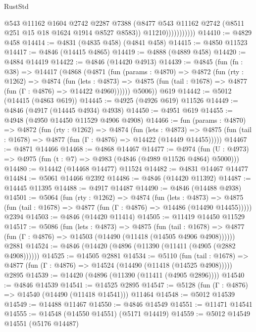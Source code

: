 \begin{lexlean}{RustStd}
\begin{coremodule}
                          @543
                          @11162
                          @1604
                          @2742
                          @2287
                          @7388
                          (@8477 @543 @11162 @2742 (@8511 @251 @15 @18 @1624 @1914 @8527 @8583))
                          @11210)))))))))))
@14410 := @4829 @458
@14414 := @4831 (@4835 @458) (@4841 @458)
@14415 := @4850 @11523
@14417 := @4846 (@14415 @4865)
@14419 := @4888 (@4889 @458)
@14420 := @4884 @14419
@14422 := @4846 (@14420 @4913)
@14439 := @4845
    (fun (fn : @38) =>
    @14417
      (@4868
        (@4871
          (fun (params : @4870) =>
          @4872
            (fun (rty : @1262) =>
            @4874
              (fun (lets : @4873) =>
              @4875 (fun (tail : @1678) => @4877 (fun (Γ : @4876) => @14422 @4960))))))
        @5006))
    @619
@14442 := @5012 (@14415 (@4863 @619))
@14445 := @4925 (@4926 @619) @11526
@14449 := @4846 (@4917 (@14445 @4934) @4938)
@14450 := @4951 @619
@14455 := @4948 (@4950 @14450 @11529 @4906 @4908)
@14466 := fun (params : @4870) =>
  @4872
    (fun (rty : @1262) =>
    @4874
      (fun (lets : @4873) =>
      @4875 (fun (tail : @1678) => @4877 (fun (Γ : @4876) => @14422 (@14449 @14455)))))
@14467 := @4871 @14466
@14468 := @4868 @14467
@14477 := @4974
    (fun (U : @4973) => @4975 (fun (t : @7) => @4983 (@4846 (@4989 @11526 @4864) @5000)))
@14480 := @14442 (@14468 @14477) @11524
@14482 := @4831 @14467 @14477
@14484 := @5061 @14466 @2392
@14486 := @4846 (@14420 @11392)
@14487 := @14445 @11395
@14488 := @4917 @14487
@14490 := @4846 (@14488 @4938)
@14501 := @5064
    (fun (rty : @1262) =>
    @4874
      (fun (lets : @4873) =>
      @4875 (fun (tail : @1678) => @4877 (fun (Γ : @4876) => @14486 (@14490 @14455)))))
    @2394
@14503 := @4846 (@14420 @11414)
@14505 := @11419 @14450 @11529
@14517 := @5086
    (fun (lets : @4873) =>
    @4875
      (fun (tail : @1678) =>
      @4877 (fun (Γ : @4876) => @14503 (@14490 (@11418 (@14505 @4906 @4908))))))
    @2881
@14524 := @4846 (@14420 (@4896 (@11390 (@11411 (@4905 (@2882 @4908))))))
@14525 := @14505 @2881
@14534 := @5110
    (fun (tail : @1678) => @4877 (fun (Γ : @4876) => @14524 (@14490 (@11418 (@14525 @4908)))))
    @2895
@14539 := @14420 (@4896 (@11390 (@11411 (@4905 @2896))))
@14540 := @4846 @14539
@14541 := @14525 @2895
@14547 := @5128 (fun (Γ : @4876) => @14540 (@14490 (@11418 @14541))) @11464
@14548 := @5012 @14539
@14549 := @14488 @11467
@14550 := @4846 @14549
@14551 := @11471 @14541
@14555 := @14548 (@14550 @14551) (@5171 @14419)
@14559 := @5012 @14549 @14551 (@5176 @14487)

\end{coremodule}
\end{lexlean}
